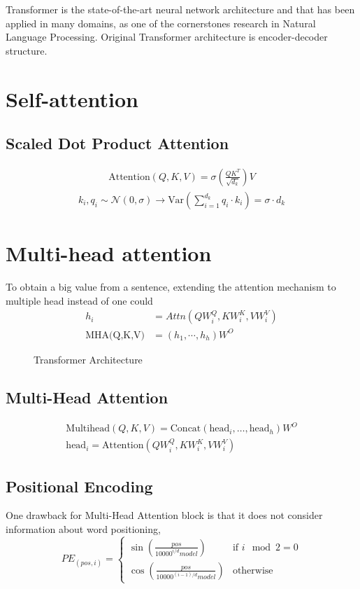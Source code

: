Transformer \cite{vaswani_attention_nodate} is the state-of-the-art neural network architecture and that has been applied in many domains, as one of the cornerstones research in Natural Language Processing. Original Transformer architecture is encoder-decoder structure. 
\section{Self-attention}
\subsection{Scaled Dot Product Attention}
\begin{align*}
\text{Attention}(Q,K,V) = \sigma\left(\frac{QK^T}{\sqrt{d_k}}\right)V
\end{align*}
\begin{align*}
k_i, q_i\sim\mathcal{N}(0,\sigma)\rightarrow\text{Var}\left(\sum_{i=1}^{d_k}q_i\cdot k_i\right)=\sigma\cdot d_k
\end{align*}
\section{Multi-head attention}
To obtain a big value from a sentence, extending the attention mechanism to multiple head instead of one could 
\begin{align*}
h_i&=Attn(QW_i^Q,KW_i^K,VW_i^V)\\
\text{MHA(Q,K,V)}&=(h_1,\cdots,h_h)W^O
\end{align*}
\begin{figure}
\caption{Transformer Architecture}
\label{fig:transformer_arch}
\end{figure}
\subsection{Multi-Head Attention}
\begin{align*}
\text{Multihead}(Q,K,V)=\text{Concat}(\text{head}_i,\dots,\text{head}_h)W^O \\
\text{head}_i = \text{Attention}(QW_i^{Q}, KW_i^K,VW_i^V)
\end{align*}
\subsection{Positional Encoding}
One drawback for Multi-Head Attention block is that it does not consider information about word positioning, 
\[ PE_{(pos,i)} = \begin{cases} 
\sin\left(\frac{pos}{10000^{i/d}model}\right) & \text{if }i \mod 2 = 0 \\
\cos\left(\frac{pos}{10000^{(i-1)/d}model}\right) & \text{otherwise}
       \end{cases}
    \]